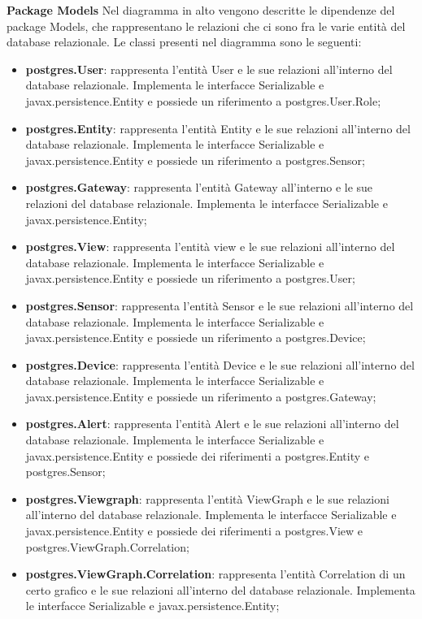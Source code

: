 		\newpage
		\textbf{Package Models}
		\newline\newline
		Nel diagramma in alto vengono descritte le dipendenze del package Models, che rappresentano le relazioni che ci sono fra le varie entità del database relazionale.
		Le classi presenti nel diagramma sono le seguenti:
		\begin{itemize}
			\item \textbf{postgres.User}: rappresenta l'entità User e le sue relazioni all'interno del database relazionale. Implementa le interfacce Serializable e javax.persistence.Entity e possiede un riferimento a postgres.User.Role;
			\item \textbf{postgres.Entity}: rappresenta l'entità Entity e le sue relazioni all'interno del database relazionale. Implementa le interfacce Serializable e javax.persistence.Entity e possiede un riferimento a postgres.Sensor;
			\item \textbf{postgres.Gateway}: rappresenta l'entità Gateway all'interno e le sue relazioni del database relazionale. Implementa le interfacce Serializable e javax.persistence.Entity;
			\item \textbf{postgres.View}: rappresenta l'entità view e le sue relazioni all'interno del database relazionale. Implementa le interfacce Serializable e javax.persistence.Entity e possiede un riferimento a postgres.User;
			\item \textbf{postgres.Sensor}: rappresenta l'entità Sensor e le sue relazioni all'interno del database relazionale. Implementa le interfacce Serializable e javax.persistence.Entity e possiede un riferimento a postgres.Device;
			\item \textbf{postgres.Device}: rappresenta l'entità Device e le sue relazioni all'interno del database relazionale. Implementa le interfacce Serializable e javax.persistence.Entity e possiede un riferimento a postgres.Gateway;
			\item \textbf{postgres.Alert}: rappresenta l'entità Alert e le sue relazioni all'interno del database relazionale. Implementa le interfacce Serializable e javax.persistence.Entity e possiede dei riferimenti a postgres.Entity e postgres.Sensor;
			\item \textbf{postgres.Viewgraph}: rappresenta l'entità ViewGraph e le sue relazioni all'interno del database relazionale. Implementa le interfacce Serializable e javax.persistence.Entity e possiede dei riferimenti a postgres.View e postgres.ViewGraph.Correlation;
			\item \textbf{postgres.ViewGraph.Correlation}: rappresenta l'entità Correlation di un certo grafico e le sue relazioni all'interno del database relazionale. Implementa le interfacce Serializable e javax.persistence.Entity;

\end{itemize}
